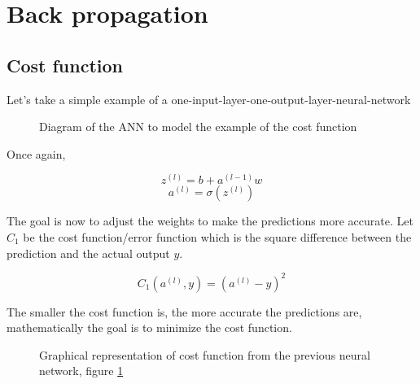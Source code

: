 \documentclass[]{report}
\begin{document}
\section{Back propagation}

\subsection{Cost function}

{Let's take a simple example of a one-input-layer-one-output-layer-neural-network}

\begin{figure}[H]
    \centering
    \begin{neuralnetwork}[height=2, nodespacing=15mm]
        \newcommand{\inputtext}[2]{$a^{(l-1)}$}
        \newcommand{\outputtext}[2]{$a^{(l)}$}
        \inputlayer[count=1, bias=false, text=\inputtext, title=Input layer]
        \outputlayer[count=1,  text=\outputtext, title=Output layer]
        \linklayers[title=Weight $w$]
    \end{neuralnetwork}
    \caption{Diagram of the ANN to model the example of the cost function}
    \label{fig:simplenn}
\end{figure}

{Once again,}

\[z^{(l)}=b+a^{(l-1)}w\]
\[a^{(l)}=\sigma\left(z^{(l)}\right)\]

{The goal is now to adjust the weights to make the predictions more accurate. Let $C_1$ be the cost function/error function which is the square difference between the prediction and the actual output $y$.}

\[C_1\left(a^{(l)},y\right)=\left(a^{(l)}-y\right)^2\]

{The smaller the cost function is, the more accurate the predictions are, mathematically the goal is to minimize the cost function.}

\begin{figure}[H]
    \centering
    \caption{Graphical representation of cost function from the previous neural network, figure \ref{fig:simplenn}}
\end{figure}
\end{document}

